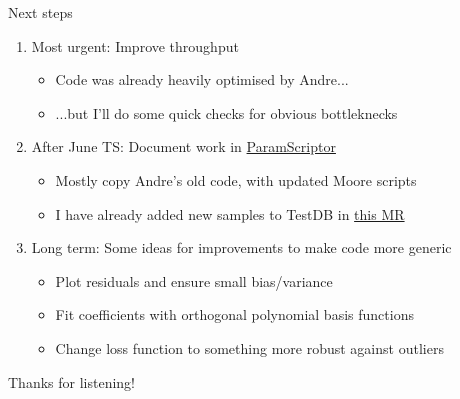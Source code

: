 \documentclass[xcolor={dvipsnames}]{beamer}
\begin{document}
\begin{frame}{Next steps}
  \vspace{0.0cm}
  \begin{enumerate}
    \setlength\itemsep{1.8em}
    \item{Most urgent: Improve throughput}
    \begin{itemize}
      \item{Code was already heavily optimised by Andre...}
      \item{...but I'll do some quick checks for obvious bottleknecks}
    \end{itemize}
    \item{After June TS: Document work in \href{https://gitlab.cern.ch/lhcb/paramscriptor}{ParamScriptor}}
    \begin{itemize}
      \item{Mostly copy Andre's old code, with updated Moore scripts}
      \item{I have already added new samples to TestDB in \href{https://gitlab.cern.ch/lhcb-datapkg/PRConfig/-/merge_requests/567}{this MR}}
    \end{itemize}
    \item{Long term: Some ideas for improvements to make code more generic}
    \begin{itemize}
      \item{Plot residuals and ensure small bias/variance}
      \item{Fit coefficients with orthogonal polynomial basis functions}
      \item{Change loss function to something more robust against outliers}
    \end{itemize}
  \end{enumerate}
  \begin{center}
    \Huge Thanks for listening!
  \end{center}
\end{frame}
\end{document}
